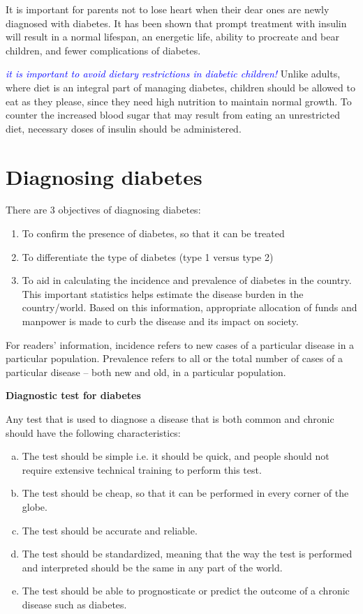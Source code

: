 It is important for parents not to lose heart when their dear ones are newly diagnosed with diabetes. It has been shown that prompt treatment with insulin will result in a normal lifespan, an energetic life, ability to procreate and bear children, and fewer complications of diabetes.

\textcolor{blue}{\textit{it is important to avoid dietary restrictions in diabetic children!}} Unlike adults, where diet is an integral part of managing diabetes, children should be allowed to eat as they please, since they need high nutrition to maintain normal growth. To counter the increased blood sugar that may result from eating an unrestricted diet, necessary doses of insulin should be administered.



\chapter{Diagnosing diabetes}\label{chap5}

There are 3 objectives of diagnosing diabetes:

\begin{enumerate}
\itemsep=0pt
\item To confirm the presence of diabetes, so that it can be treated
\item To differentiate the type of diabetes (type 1 versus type 2)
\item To aid in calculating the incidence and prevalence of diabetes in the country. This important statistics helps estimate the disease burden in the country/world. Based on this information, appropriate allocation of funds and manpower is made to curb the disease and its impact on society.
\end{enumerate}

For readers’ information, incidence refers to new cases of a parti\-cular disease in a particular population. Prevalence refers to all or the total number of cases of a particular disease – both new and old, in a particular population.

\noindent
\textbf{Diagnostic test for diabetes}

Any test that is used to diagnose a disease that is both common and chronic should have the following characteristics:

\begin{enumerate}[a.]
\itemsep=0pt
\item The test should be simple i.e. it should be quick, and people should not require extensive technical training to perform this test.
 \item The test should be cheap, so that it can be performed in every corner of the globe.
 \item The test should be accurate and reliable.
 \item The test should be standardized, meaning that the way the test is performed and interpreted should be the same in any part of the world.
 \item The test should be able to prognosticate or predict the outcome of a chronic disease such as diabetes.
 \end{enumerate}

